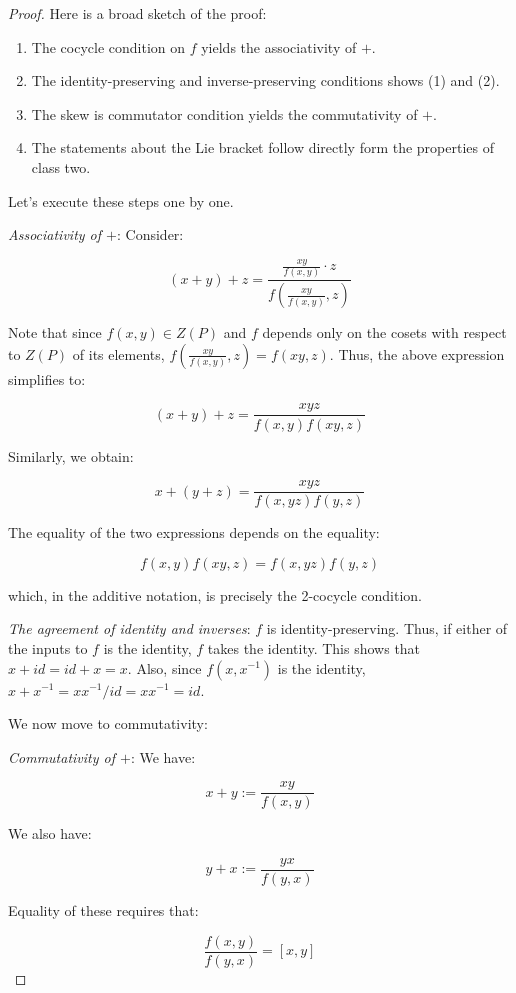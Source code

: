 \documentclass[10pt]{amsart}
\begin{document}
\begin{proof}
  Here is a broad sketch of the proof:
  \begin{enumerate}
  \item The cocycle condition on $f$ yields the associativity of $+$.
  \item The identity-preserving and inverse-preserving conditions
  shows (1) and (2).
  \item The skew is commutator condition yields the commutativity of
    $+$.
  \item The statements about the Lie bracket follow directly form the
    properties of class two.
  \end{enumerate}

  Let's execute these steps one by one.

  {\em Associativity of $+$}: Consider:

  $$(x + y) + z = \frac{\frac{xy}{f(x,y)} \cdot z}{f\left(\frac{xy}{f(x,y)},z\right)}$$

  Note that since $f(x,y) \in Z(P)$ and $f$ depends only on the cosets
  with respect to $Z(P)$ of its elements, $f(\frac{xy}{f(x,y)},z) =
  f(xy,z)$. Thus, the above expression simplifies to:

  $$(x + y) + z = \frac{xyz}{f(x,y)f(xy,z)}$$

  Similarly, we obtain:

  $$x + (y + z) = \frac{xyz}{f(x,yz)f(y,z)}$$

  The equality of the two expressions depends on the equality:

  $$f(x,y)f(xy,z) = f(x,yz)f(y,z)$$

  which, in the additive notation, is precisely the 2-cocycle
  condition.

  {\em The agreement of identity and inverses}: $f$ is
  identity-preserving. Thus, if either of the inputs to $f$ is the
  identity, $f$ takes the identity. This shows that $x + id = id + x =
  x$. Also, since $f(x,x^{-1})$ is the identity, $x + x^{-1} =
  xx^{-1}/id = xx^{-1} = id$.

  We now move to commutativity:

  {\em Commutativity of $+$}: We have:

  $$x + y := \frac{xy}{f(x,y)}$$

  We also have:

  $$y + x := \frac{yx}{f(y,x)}$$

  Equality of these requires that:

  $$\frac{f(x,y)}{f(y,x)} = [x,y]$$


\end{proof}
\end{document}
